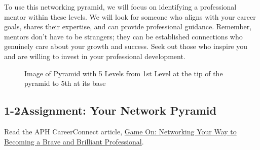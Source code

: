To use this networking pyramid, we will focus on identifying a professional mentor within these levels. We will look for someone who aligns with your career goals, shares their expertise, and can provide professional guidance. Remember, mentors don’t have to be strangers; they can be established connections who genuinely care about your growth and success. Seek out those who inspire you and are willing to invest in your professional development.
\clearpage
\mbox{}
\vfill 
\begin{figure}[!ht]
    \centering
    \caption{Image of Pyramid with 5 Levels from 1st Level at the tip of the pyramid to 5th at its base}
\end{figure}
\mbox{}
\vfill{}
\clearpage


\pagebreak \subsection*{1-2\quad Assignment: Your Network Pyramid}
Read the APH CareerConnect article, \href{https://aphconnectcenter.org/careerconnect-blog/networking-your-way-to-becoming-a-brave-and-brilliant-professional/}{Game On: Networking Your Way to Becoming a Brave and Brilliant Professional}.

